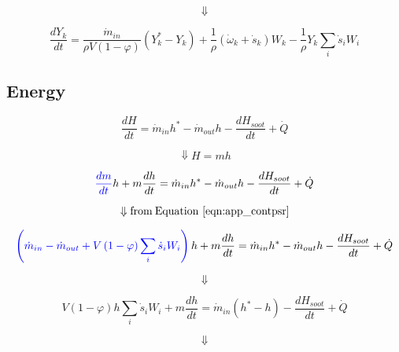 \begin{equation*}
	\Downarrow
\end{equation*}

\begin{equation}
	\frac{dY_k}{dt}=\frac{{\dot{m}}_{in}}{\rho V\left(1-\varphi\right)}\left(Y_k^\ast-Y_k\right)+\frac{1}{\rho}\left({\dot{\omega}}_k+{\dot{s}}_k\right)W_k-\frac{1}{\rho}Y_k\sum_{i}{{\dot{s}}_iW_i}
	\label{eqn:app_spiciespsr}
\end{equation}

\subsection{Energy}

\begin{equation*}
	\frac{dH}{dt}={\dot{m}}_{in}h^\ast-{\dot{m}}_{out}h-\frac{dH_{soot}}{dt}+\dot{Q}
\end{equation*}

\begin{equation*}
	\Downarrow H=mh
\end{equation*}


\begin{equation*}
	\color{blue}
	\frac{dm}{dt}
	\color{black}
	h+m\frac{dh}{dt}={\dot{m}}_{in}h^\ast-{\dot{m}}_{out}h-\frac{dH_{soot}}{dt}+\dot{Q}
\end{equation*}

\begin{equation*}
	\Downarrow \mathrm{from \: Equation~\ref{eqn:app_contpsr}}
\end{equation*}

\begin{equation*}
	\color{blue}
	\left(
		{\dot{m}}_{in}-{\dot{m}}_{out}
		+V\left(1-\varphi\right)\sum_{i}{{\dot{s}}_iW_i}
	\right)
	\color{black}h+m\frac{dh}{dt}={\dot{m}}_{in}h^\ast-{\dot{m}}_{out}h-\frac{dH_{soot}}{dt}+\dot{Q}
\end{equation*}

\begin{equation*}
	\Downarrow
\end{equation*}


\begin{equation*}
	V\left(1-\varphi\right)h\sum_{i}{{\dot{s}}_iW_i}+m\frac{dh}{dt}={\dot{m}}_{in}\left(h^\ast-h\right)-\frac{dH_{soot}}{dt}+\dot{Q}
\end{equation*}

\begin{equation*}
	\Downarrow
\end{equation*}

